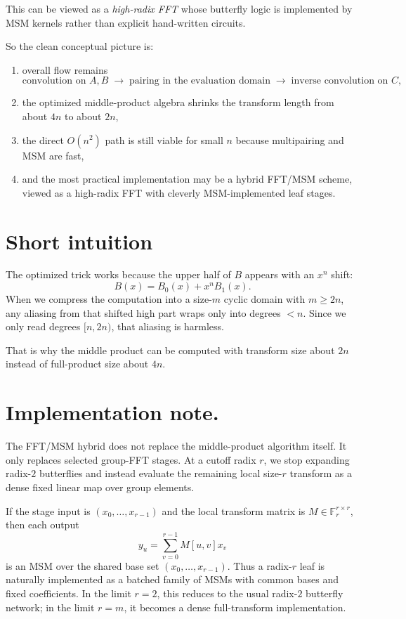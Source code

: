 \documentclass[11pt]{article}
\begin{document}
This can be viewed as a \emph{high-radix FFT} whose butterfly logic is implemented by MSM kernels rather than explicit hand-written circuits.

So the clean conceptual picture is:
\begin{enumerate}[itemsep=0.3em, topsep=0.4em]
  \item overall flow remains
  \[
  \text{convolution on } A,B \;\to\; \text{pairing in the evaluation domain} \;\to\; \text{inverse convolution on } C,
  \]
  \item the optimized middle-product algebra shrinks the transform length from about $4n$ to about $2n$,
  \item the direct $O(n^2)$ path is still viable for small $n$ because multipairing and MSM are fast,
  \item and the most practical implementation may be a hybrid FFT/MSM scheme, viewed as a high-radix FFT with cleverly MSM-implemented leaf stages.
\end{enumerate}

\section{Short intuition}

The optimized trick works because the upper half of $B$ appears with an $x^n$ shift:
\[
B(x) = B_0(x) + x^n B_1(x).
\]
When we compress the computation into a size-$m$ cyclic domain with $m \ge 2n$, any aliasing from that shifted high part wraps only into degrees $< n$. Since we only read degrees $[n,2n)$, that aliasing is harmless.

That is why the middle product can be computed with transform size about $2n$ instead of full-product size about $4n$.

\section{Implementation note.}
The FFT/MSM hybrid does not replace the middle-product algorithm itself.
It only replaces selected group-FFT stages.
At a cutoff radix $r$, we stop expanding radix-$2$ butterflies and instead
evaluate the remaining local size-$r$ transform as a dense fixed linear map
over group elements.

If the stage input is $(x_0,\dots,x_{r-1})$ and the local transform matrix is
$M \in \mathbb{F}_r^{r \times r}$, then each output
\[
y_u = \sum_{v=0}^{r-1} M[u,v] x_v
\]
is an MSM over the shared base set $(x_0,\dots,x_{r-1})$.
Thus a radix-$r$ leaf is naturally implemented as a batched family of MSMs
with common bases and fixed coefficients.
In the limit $r=2$, this reduces to the usual radix-$2$ butterfly network;
in the limit $r=m$, it becomes a dense full-transform implementation.
\end{document}

